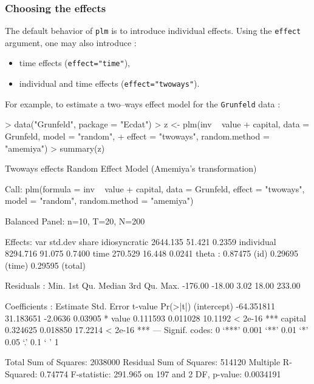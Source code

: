 \documentclass[a4paper]{article}
\begin{document}
\subsubsection{Choosing  the effects}

The default behavior of \texttt{plm} is to introduce individual
effects. Using the \texttt{effect} argument, one may also introduce :

\begin{itemize}
\item time effects (\texttt{effect="time"}),
\item individual and time effects (\texttt{effect="twoways"}).
\end{itemize}

For example, to estimate a two--ways effect model for the
\texttt{Grunfeld} data :

\begin{Schunk}
\begin{Sinput}
> data("Grunfeld", package = "Ecdat")
> z <- plm(inv ~ value + capital, data = Grunfeld, model = "random", 
+     effect = "twoways", random.method = "amemiya")
> summary(z)
\end{Sinput}
\begin{Soutput}
Twoways effects Random Effect Model (Amemiya's transformation)

Call:
plm(formula = inv ~ value + capital, data = Grunfeld, effect = "twoways", 
    model = "random", random.method = "amemiya")

Balanced Panel: n=10, T=20, N=200

Effects:
                   var  std.dev  share
idiosyncratic 2644.135   51.421 0.2359
individual    8294.716   91.075 0.7400
time           270.529   16.448 0.0241
theta  : 0.87475 (id) 0.29695 (time) 0.29595 (total)

Residuals :
   Min. 1st Qu.  Median 3rd Qu.    Max. 
-176.00  -18.00    3.02   18.00  233.00 

Coefficients :
              Estimate Std. Error t-value Pr(>|t|)    
(intercept) -64.351811  31.183651 -2.0636  0.03905 *  
value         0.111593   0.011028 10.1192  < 2e-16 ***
capital       0.324625   0.018850 17.2214  < 2e-16 ***
---
Signif. codes:  0 ‘***’ 0.001 ‘**’ 0.01 ‘*’ 0.05 ‘.’ 0.1 ‘ ’ 1 

Total Sum of Squares: 2038000
Residual Sum of Squares: 514120
Multiple R-Squared: 0.74774
F-statistic: 291.965 on 197 and 2 DF, p-value: 0.0034191
\end{Soutput}
\end{Schunk}
\end{document}

